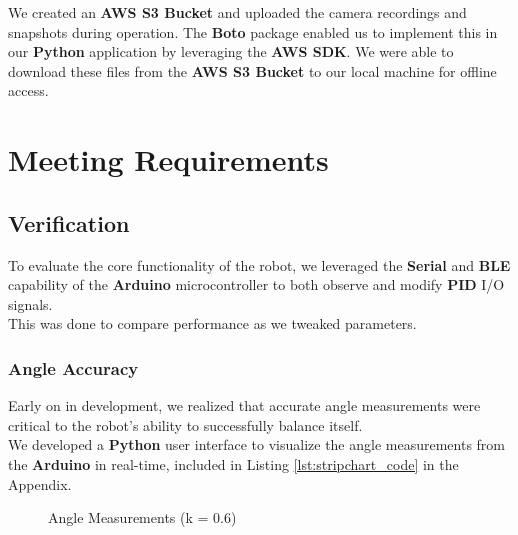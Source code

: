 \documentclass{article}
\begin{document}
\begin{minipage}{\linewidth}
    We created an \textbf{AWS S3 Bucket} and uploaded the camera recordings and snapshots during operation.
    The \textbf{Boto} package enabled us to implement this in our \textbf{Python} application by leveraging the \textbf{AWS SDK}.
    We were able to download these files from the \textbf{AWS S3 Bucket} to our local machine for offline access.
\end{minipage}

\section{Meeting Requirements}
\subsection{Verification}

\begin{minipage}{\linewidth}
    To evaluate the core functionality of the robot, we leveraged the \textbf{Serial} and \textbf{BLE} capability of the \textbf{Arduino} microcontroller to both observe and modify \textbf{PID} I/O signals. \\

    This was done to compare performance as we tweaked parameters. \\
\end{minipage}

\subsubsection{Angle Accuracy}

\begin{minipage}{\linewidth}
    Early on in development, we realized that accurate angle measurements were critical to the robot's ability to successfully
    balance itself. \\

    We developed a \textbf{Python} user interface to visualize the angle measurements from the \textbf{Arduino} in real-time,
    included in Listing \ref{lst:stripchart_code} in the Appendix. \\
\end{minipage}

\begin{figure}[H]
    \centering
    \caption{Angle Measurements (k = 0.6)}
    \label{fig:stripchart_k06}
\end{figure}
\end{document}
